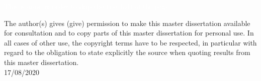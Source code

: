 \textcolor{white}{This is done in order to skip the first half of the page}\\
\fontsize{10}{12}

\vspace{21cm}%

%
%
%
%

\noindent\textsf{The author(s) gives (give) permission to make this master dissertation available for consultation and to copy parts of this master dissertation for personal use. In all cases of other use, the copyright terms have to be respected, in particular with regard to the obligation to state explicitly the source when quoting results from this master dissertation.}\\

\noindent\textsf{17/08/2020}